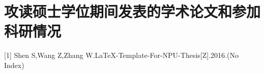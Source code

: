 \chapter*{攻读硕士学位期间发表的学术论文和参加科研情况}

[1]	Shen S,Wang Z,Zhang W.{{\LaTeX}}-Template-For-NPU-Thesis[Z].2016.(No Index)

\clearpage
\endinput